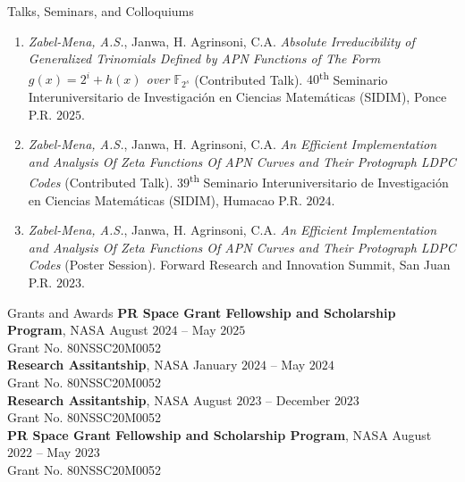 \documentclass{resume}
\begin{document}
\begin{rSection}{Talks, Seminars, and Colloquiums}
  \begin{enumerate}
    \item \textit{Zabel-Mena, A.S.}, Janwa, H. Agrinsoni, C.A.
      \textit{Absolute Irreducibility of Generalized
        Trinomials Defined by APN Functions of The Form
      $g(x)=2^{i}+h(x)$ over $\mathbb{F}_{2^s}$} (Contributed Talk).
      $40$\textsuperscript{th} Seminario Interuniversitario de
      Investigaci\'on en Ciencias Matem\'aticas (SIDIM), Ponce P.R.
      $2025$.

    \item \textit{Zabel-Mena, A.S.}, Janwa, H. Agrinsoni, C.A.
      \textit{An Efficient Implementation and Analysis Of Zeta
      Functions Of APN Curves and Their Protograph LDPC Codes}
      (Contributed Talk). $39$\textsuperscript{th} Seminario
      Interuniversitario de Investigaci\'on en Ciencias Matem\'aticas
      (SIDIM), Humacao P.R. $2024$.

    \item \textit{Zabel-Mena, A.S.}, Janwa, H. Agrinsoni, C.A.
      \textit{An Efficient Implementation and Analysis Of Zeta
      Functions Of APN Curves and Their Protograph LDPC Codes}
      (Poster Session). Forward Research and Innovation Summit, San
      Juan P.R. $2023$.
  \end{enumerate}
\end{rSection}

\begin{rSection}{Grants and Awards}
  \textbf{PR Space Grant Fellowship and Scholarship Program}, NASA
  \hfill{August $2024$ -- May $2025$} \\
  Grant No. 80NSSC20M0052 \\

  \textbf{Research Assitantship}, NASA
  \hfill{January $2024$ -- May $2024$} \\
  Grant No. 80NSSC20M0052 \\

  \textbf{Research Assitantship}, NASA
  \hfill{August $2023$ -- December $2023$} \\
  Grant No. 80NSSC20M0052 \\

  \textbf{PR Space Grant Fellowship and Scholarship Program}, NASA
  \hfill{August $2022$ -- May $2023$} \\
  Grant No. 80NSSC20M0052 \\
\end{rSection}
\end{document}
